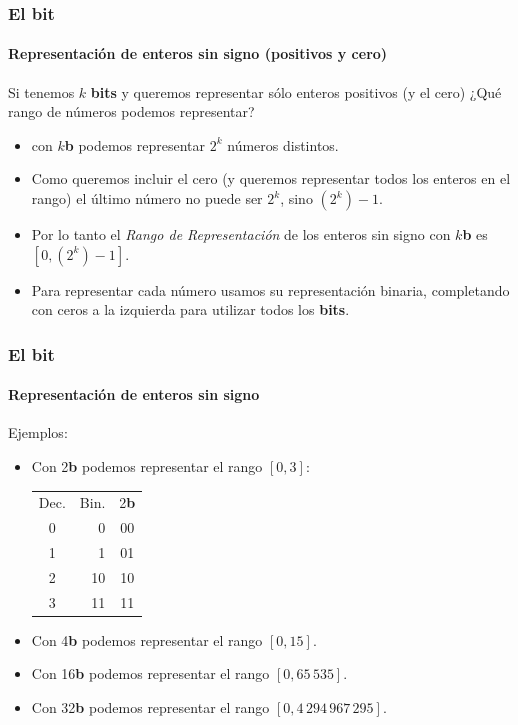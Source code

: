 \documentclass[11pt,a4paper,spanish]{beamer}
\newcommand{\bit}{\textbf{b}}
\begin{document}
\begin{frame}

\frametitle{El \textbf{bit}}
\framesubtitle{Representación de enteros sin signo (positivos y cero)}

    Si tenemos $k$ \textbf{bits} y queremos representar sólo enteros positivos
    (y el cero) ¿Qué rango de números podemos representar?

    \pause
    \begin{itemize}
        \item con $k$\bit{} podemos representar $2^{k}$ números distintos.
            \pause
        \item Como queremos incluir el cero (y queremos representar todos los
            enteros en el rango) el último número no puede ser $2^{k}$, sino
            $(2^{k})-1$. \pause
        \item Por lo tanto el \emph{Rango de Representación} de los enteros
            sin signo con $k$\bit{} es $[0,(2^{k})-1]$.\pause
        \item Para representar cada número usamos su representación binaria,
            completando con ceros a la izquierda para utilizar todos los
            \textbf{bits}.
    \end{itemize}
\end{frame}

\begin{frame}

\frametitle{El bit}
\framesubtitle{Representación de enteros sin signo}

    Ejemplos:
    \begin{itemize}
        \item Con 2\bit{} podemos representar el rango $[0,3]$:
        {
        \large
        \begin{tabular}{c r c}
            Dec. & {\centering Bin.} & 2\bit\\
            0 & 0 & 00\\ \hline
            1 & 1 & 01\\ \hline
            2 & 10 & 10\\ \hline
            3 & 11 & 11\\
        \end{tabular}
        }\pause

    \item Con 4\bit{} podemos representar el rango $[0,15]$.
    \item Con 16\bit{} podemos representar el rango $[0,65\,535]$.
    \item Con 32\bit{} podemos representar el rango $[0,4\,294\,967\,295]$.
    \end{itemize}

\end{frame}
\end{document}
